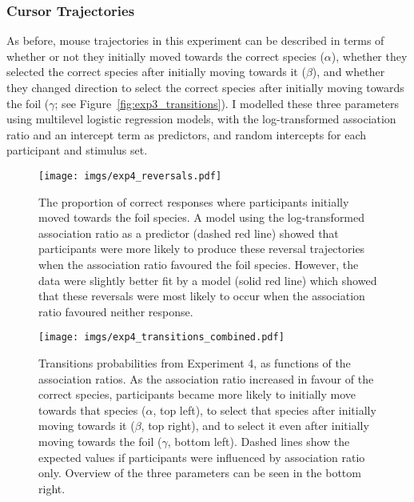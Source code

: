 \subsubsection{Cursor Trajectories}


As before, mouse trajectories in this experiment
can be described in terms of whether or not
they initially moved towards the correct species ($\alpha$),
whether they selected the correct species
after initially moving towards it ($\beta$),
and whether they changed direction to select the correct species
after initially moving towards the foil ($\gamma$;
see Figure~\ref{fig:exp3_transitions}).
I modelled these three parameters
using multilevel logistic regression models,
with the log-transformed association ratio
and an intercept term as predictors,
and random intercepts for each participant and stimulus set.

\begin{figure}[tp]
  \centering
  \texttt{[image: imgs/exp4\_reversals.pdf]}
  \caption[Proportion of correct responses that involved reversals,
  Experiment 4.]{
    The proportion of correct responses
    where participants initially moved towards the foil species.
    A model using the log-transformed association ratio as a predictor
    (dashed red line) showed that participants were more likely
    to produce these reversal trajectories when the association ratio
    favoured the foil species.
    However, the data were slightly better fit by a model (solid red line)
    which showed that these reversals were most likely to occur
    when the association ratio favoured neither response.
    \label{fig:exp4_reversals}
  }
\end{figure}

\begin{figure}[bp]
  \centering
  \texttt{[image: imgs/exp4\_transitions\_combined.pdf]}
  \caption[Transition probabilities, as a function of the association ratio,
    in Experiment 4.]{
    \label{fig:exp4_transitions}
    Transitions probabilities from Experiment 4,
    as functions of the association ratios.
    As the association ratio increased in favour of the correct species,
    participants became more likely to initially move towards that species ($\alpha$, top left),
    to select that species after initially moving towards it ($\beta$, top right),
    and to select it even after initially moving towards the foil ($\gamma$, bottom left).
    Dashed lines show the expected values if participants were
    influenced by association ratio only.
    Overview of the three parameters can be seen in the bottom right.
  }
\end{figure}


